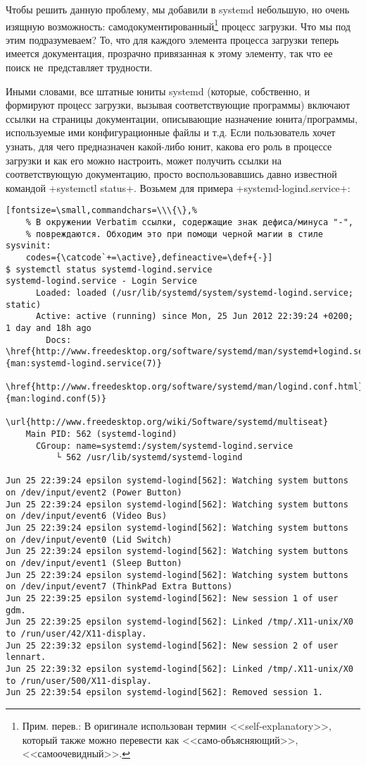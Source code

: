 \documentclass[10pt,oneside,a4paper]{article}
\begin{document}
Чтобы решить данную проблему, мы добавили в systemd небольшую, но очень изящную
возможность: самодокументированный\footnote{Прим. перев.: В оригинале
использован термин <<self-explanatory>>, который также можно перевести как
<<само-объясняющий>>, <<самоочевидный>>.} процесс загрузки. Что мы под этим
подразумеваем? То, что для каждого элемента процесса загрузки теперь имеется
документация, прозрачно привязанная к этому элементу, так что ее поиск
не~представляет трудности.

Иными словами, все штатные юниты systemd (которые, собственно, и формируют
процесс загрузки, вызывая соответствующие программы) включают ссылки на страницы
документации, описывающие назначение юнита/программы, используемые ими
конфигурационные файлы и т.д. Если пользователь хочет узнать, для чего
предназначен какой-либо юнит, какова его роль в процессе загрузки и как его
можно настроить, может получить ссылки на соответствующую документацию, просто
воспользовавшись давно известной командой +systemctl status+. Возьмем для
примера +systemd-logind.service+:
\begin{Verbatim}[fontsize=\small,commandchars=\\\{\},%
	% В окружении Verbatim ссылки, содержащие знак дефиса/минуса "-",
	% повреждаются. Обходим это при помощи черной магии в стиле sysvinit:
	codes={\catcode`+=\active},defineactive=\def+{-}]
$ systemctl status systemd-logind.service
systemd-logind.service - Login Service
	  Loaded: loaded (/usr/lib/systemd/system/systemd-logind.service; static)
	  Active: active (running) since Mon, 25 Jun 2012 22:39:24 +0200; 1 day and 18h ago
	    Docs: \href{http://www.freedesktop.org/software/systemd/man/systemd+logind.service.html}{man:systemd-logind.service(7)}
	          \href{http://www.freedesktop.org/software/systemd/man/logind.conf.html}{man:logind.conf(5)}
	          \url{http://www.freedesktop.org/wiki/Software/systemd/multiseat}
	Main PID: 562 (systemd-logind)
	  CGroup: name=systemd:/system/systemd-logind.service
		  └ 562 /usr/lib/systemd/systemd-logind

Jun 25 22:39:24 epsilon systemd-logind[562]: Watching system buttons on /dev/input/event2 (Power Button)
Jun 25 22:39:24 epsilon systemd-logind[562]: Watching system buttons on /dev/input/event6 (Video Bus)
Jun 25 22:39:24 epsilon systemd-logind[562]: Watching system buttons on /dev/input/event0 (Lid Switch)
Jun 25 22:39:24 epsilon systemd-logind[562]: Watching system buttons on /dev/input/event1 (Sleep Button)
Jun 25 22:39:24 epsilon systemd-logind[562]: Watching system buttons on /dev/input/event7 (ThinkPad Extra Buttons)
Jun 25 22:39:25 epsilon systemd-logind[562]: New session 1 of user gdm.
Jun 25 22:39:25 epsilon systemd-logind[562]: Linked /tmp/.X11-unix/X0 to /run/user/42/X11-display.
Jun 25 22:39:32 epsilon systemd-logind[562]: New session 2 of user lennart.
Jun 25 22:39:32 epsilon systemd-logind[562]: Linked /tmp/.X11-unix/X0 to /run/user/500/X11-display.
Jun 25 22:39:54 epsilon systemd-logind[562]: Removed session 1.
\end{Verbatim}
\end{document}
